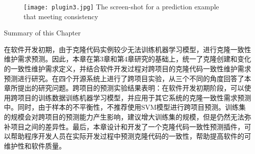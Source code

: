 \begin{figure}[htbp]
\centering
\texttt{[image: plugin3.jpg]}
{The screen-shot for a prediction example that meeting consistency}
\vspace{-1em}
\end{figure}



{Summary of this Chapter}

在软件开发初期，由于克隆代码实例较少无法训练机器学习模型，进行克隆一致性维护需求预测。因此，本章在第3章和第4章研究的基础上，统一了克隆创建和变化的一致性维护需求定义，并结合软件开发过程对跨项目的克隆代码一致性维护需求预测进行研究。在四个开源系统上进行了跨项目实验，从三个不同的角度回答了本章所提出的研究问题。跨项目的预测实验结果表明：在软件开发初期阶段，可以使用跨项目的训练数据训练机器学习模型，并应用于其它系统的克隆一致性需求预测中。同时，由于样本的不平衡性，不推荐使用SVM模型进行跨项目预测。训练集的规模会对跨项目的预测能力产生影响，建议增大训练集的规模，但是仍然无法弥补项目之间的差异性。最后，本章设计和开发了一个克隆代码一致性预测插件，可以帮助程序开发人员在实际开发过程中预测克隆代码的一致性，帮助提高软件的可维护性和软件质量。